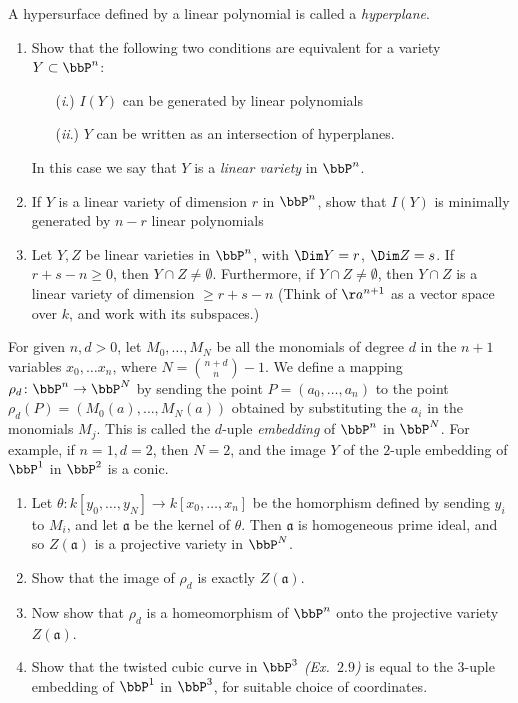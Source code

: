 \begin{exercise}[2.11]
    A hypersurface defined by a linear polynomial is called a \emph{hyperplane}. 
        \begin{enumerate}
            \item Show that the following two conditions are equivalent for a variety $Y \subset \bbP^n$: 
                \begin{itemize}
                \item[(\emph{i}.)] $I(Y)$ can be generated by linear polynomials
                \item[(\emph{ii}.)] $Y$ can be written as an intersection of hyperplanes. 
                \end{itemize}
                In this case we say that $Y$ is a \emph{linear variety} in $\bbP^n$.
            \item If $Y$ is a linear variety of dimension $r$ in $\bbP^n$, show that $I(Y)$ is minimally generated by $n-r$ linear polynomials 
            \item Let $Y,Z$ be linear varieties in $\bbP^n$, with $\Dim Y = r$, $\Dim Z = s$. If $r+s-n \geq 0$, then $Y \cap Z \neq \emptyset$. 
            Furthermore, if $Y \cap Z \neq \emptyset$, then $Y \cap Z$ is a linear variety 
            of dimension $\geq r+s-n$ (Think of $\aa^{n+1}$ as a vector 
            space over $k$, and work with its subspaces.)
        \end{enumerate}
\end{exercise}

\newpage

\begin{exercise}[2.12]
    For given $n, d>0$, let
    $M_0,\ldots, M_N$ be all the monomials of degree $d$ in the $n+1$ variables
    $x_0, \ldots x_n$, where $N = \binom{n+d}{n} -1.$ We define a mapping
    $\rho_d\colon \bbP^n \to \bbP^N$ by sending the point $P = (a_0, \ldots, a_n)$
    to the point $\rho_d(P) = (M_0(a), \ldots, M_N(a))$ obtained by substituting
    the $a_i$ in the monomials $M_j$. This is called the $d$-uple \emph{embedding}
    of $\bbP^n$ in $\bbP^N$. For example, if $n=1, d=2$, then $N= 2$, and the image
    $Y$ of the $2$-uple embedding of $\bbP^1$ in $\bbP^2$ is a conic. 
    \begin{enumerate}
      \item Let $\theta\colon k[y_0, \ldots, y_N] \to k[x_0, \ldots, x_n]$ be the
        homorphism defined by sending $y_i$ to $M_i$, and let $\mathfrak{a}$ be
        the kernel of $\theta$. Then $\mathfrak{a}$ is homogeneous prime ideal, and
        so $Z(\mathfrak{a})$ is a projective variety in $\bbP^N$. 
      \item Show that the image of $\rho_d$ is exactly $Z(\mathfrak{a})$.
      \item Now show that $\rho_d$ is a homeomorphism of $\bbP^n$ onto the projective
        variety $Z(\mathfrak{a})$. 
      \item Show that the twisted cubic curve in $\bbP^3$
        {\emph{(Ex.\ $2.9$)}} is equal to the $3$-uple
        embedding of $\bbP^1$ in $\bbP^3$, for suitable choice of coordinates. 
    \end{enumerate}
\end{exercise}

